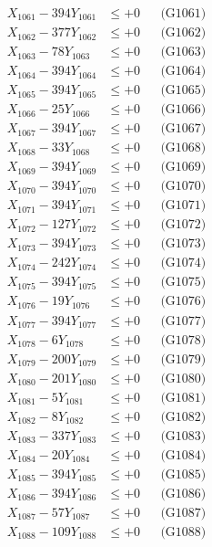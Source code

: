 \documentclass[a4paper,10pt]{article}
\begin{document}
{\begin{align}
\allowbreak
X_{1061} - 394Y_{1061} &\leq +0 && \text{(G1061)} \\
X_{1062} - 377Y_{1062} &\leq +0 && \text{(G1062)} \\
X_{1063} - 78Y_{1063} &\leq +0 && \text{(G1063)} \\
X_{1064} - 394Y_{1064} &\leq +0 && \text{(G1064)} \\
X_{1065} - 394Y_{1065} &\leq +0 && \text{(G1065)} \\
X_{1066} - 25Y_{1066} &\leq +0 && \text{(G1066)} \\
X_{1067} - 394Y_{1067} &\leq +0 && \text{(G1067)} \\
X_{1068} - 33Y_{1068} &\leq +0 && \text{(G1068)} \\
X_{1069} - 394Y_{1069} &\leq +0 && \text{(G1069)} \\
X_{1070} - 394Y_{1070} &\leq +0 && \text{(G1070)} \\
\allowbreak
X_{1071} - 394Y_{1071} &\leq +0 && \text{(G1071)} \\
X_{1072} - 127Y_{1072} &\leq +0 && \text{(G1072)} \\
X_{1073} - 394Y_{1073} &\leq +0 && \text{(G1073)} \\
X_{1074} - 242Y_{1074} &\leq +0 && \text{(G1074)} \\
X_{1075} - 394Y_{1075} &\leq +0 && \text{(G1075)} \\
X_{1076} - 19Y_{1076} &\leq +0 && \text{(G1076)} \\
X_{1077} - 394Y_{1077} &\leq +0 && \text{(G1077)} \\
X_{1078} - 6Y_{1078} &\leq +0 && \text{(G1078)} \\
X_{1079} - 200Y_{1079} &\leq +0 && \text{(G1079)} \\
X_{1080} - 201Y_{1080} &\leq +0 && \text{(G1080)} \\
\allowbreak
X_{1081} - 5Y_{1081} &\leq +0 && \text{(G1081)} \\
X_{1082} - 8Y_{1082} &\leq +0 && \text{(G1082)} \\
X_{1083} - 337Y_{1083} &\leq +0 && \text{(G1083)} \\
X_{1084} - 20Y_{1084} &\leq +0 && \text{(G1084)} \\
X_{1085} - 394Y_{1085} &\leq +0 && \text{(G1085)} \\
X_{1086} - 394Y_{1086} &\leq +0 && \text{(G1086)} \\
X_{1087} - 57Y_{1087} &\leq +0 && \text{(G1087)} \\
X_{1088} - 109Y_{1088} &\leq +0 && \text{(G1088)} \\

\end{align}}
\end{document}
